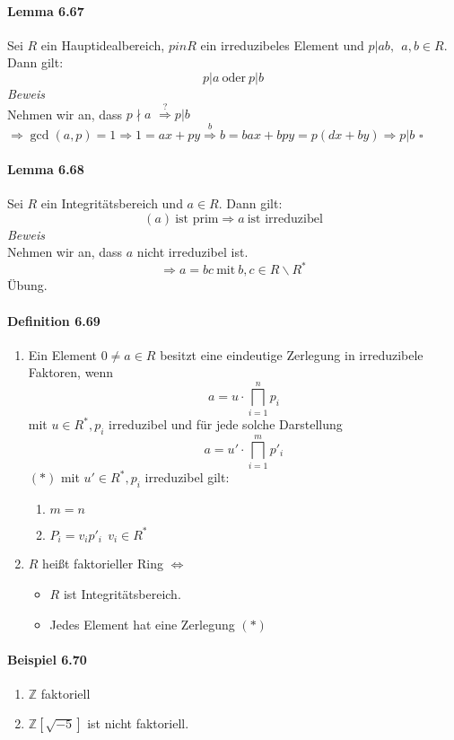 \documentclass{scrartcl}
\begin{document}
\paragraph{Lemma 6.67}
Sei $R$ ein Hauptidealbereich, $p in R$ ein irreduzibeles Element und
$p|ab, ~~ a,b \in R$. Dann gilt:
\[
  p|a ~\text{oder}~ p|b
\]
\textit{Beweis} \\
Nehmen wir an, dass $p \nmid a$ $\overset{?}{\Rightarrow} p|b$ \\
$\Rightarrow \gcd(a, p) = 1 \Rightarrow 1 = ax + py
\overset{b}{\Rightarrow} b = bax + bpy = p(dx + by) \Rightarrow p|b$ \hfill $\square$

\paragraph{Lemma 6.68}
Sei $R$ ein Integritätsbereich und $a \in R$. Dann gilt:
\[
  (a) ~ \text{ist prim} \Rightarrow a ~ \text{ist irreduzibel}
\]
\textit{Beweis} \\
Nehmen wir an, dass $a$ nicht irreduzibel ist.
\[
  \Rightarrow a = bc ~ \text{mit} ~ b,c \in R \backslash R^*
\]
Übung.

\paragraph{Definition 6.69}
\begin{enumerate}
\item Ein Element $0 \neq a \in R$ besitzt eine eindeutige Zerlegung in
  irreduzibele Faktoren, wenn
  \[
    a = u \cdot \bigsqcap_{i = 1}^n p_i
  \]
  mit $u \in R^*, p_i$ irreduzibel und für jede solche Darstellung
  \[
    a = u' \cdot \bigsqcap_{i = 1}^m p'_i
  \] $(*)$
  mit $u' \in R^*, p_i$ irreduzibel gilt:
  \begin{enumerate}
  \item $m = n$
  \item $P_i = v_ip'_i ~~ v_i \in R^*$
  \end{enumerate}
\item $R$ heißt faktorieller Ring  $\Leftrightarrow$
  \begin{itemize}
    \item $R$ ist Integritätsbereich.
    \item Jedes Element hat eine Zerlegung $(*)$
  \end{itemize}
\end{enumerate}

\paragraph{Beispiel 6.70}
\begin{enumerate}
\item $\mathbb{Z}$ faktoriell
\item $\mathbb{Z}\left[\sqrt{-5}\right]$ ist nicht faktoriell.
\end{enumerate}
\end{document}
